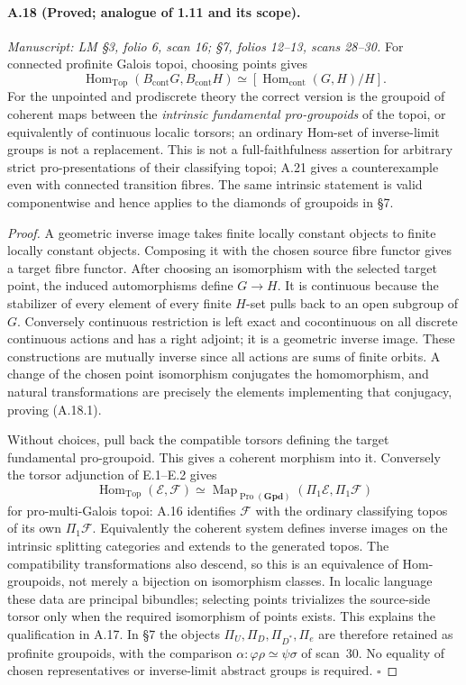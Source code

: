 \paragraph{A.18 (Proved; analogue of 1.11 and its scope).}
\textit{Manuscript: LM \S3, folio 6, scan 16; \S7, folios 12--13, scans 28--30.}
For connected profinite Galois topoi, choosing points gives
\[
 \operatorname{Hom}_{\mathrm{Top}}(B_{\mathrm{cont}}G,
                                  B_{\mathrm{cont}}H)
 \simeq[\operatorname{Hom}_{\mathrm{cont}}(G,H)/H].
                                                        \tag{A.18.1}
\]
For the unpointed and prodiscrete theory the correct version is the groupoid of coherent maps between the \emph{intrinsic fundamental pro-groupoids} of the topoi, or equivalently of continuous localic torsors; an ordinary Hom-set of inverse-limit groups is not a replacement. This is not a full-faithfulness assertion for arbitrary strict pro-presentations of their classifying topoi; A.21 gives a counterexample even with connected transition fibres. The same intrinsic statement is valid componentwise and hence applies to the diamonds of groupoids in \S7.
\begin{proof}
A geometric inverse image takes finite locally constant objects to finite locally constant objects. Composing it with the chosen source fibre functor gives a target fibre functor. After choosing an isomorphism with the selected target point, the induced automorphisms define $G\to H$. It is continuous because the stabilizer of every element of every finite $H$-set pulls back to an open subgroup of $G$. Conversely continuous restriction is left exact and cocontinuous on all discrete continuous actions and has a right adjoint; it is a geometric inverse image. These constructions are mutually inverse since all actions are sums of finite orbits. A change of the chosen point isomorphism conjugates the homomorphism, and natural transformations are precisely the elements implementing that conjugacy, proving (A.18.1).

Without choices, pull back the compatible torsors defining the target fundamental pro-groupoid. This gives a coherent morphism into it. Conversely the torsor adjunction of E.1--E.2 gives
\[
 \operatorname{Hom}_{\mathrm{Top}}(\mathcal E,\mathcal F)
 \simeq\operatorname{Map}_{\operatorname{Pro}(\mathbf{Gpd})}
             (\Pi_1\mathcal E,\Pi_1\mathcal F)
\]
for pro-multi-Galois topoi: A.16 identifies $\mathcal F$ with the ordinary classifying topos of its own $\Pi_1\mathcal F$. Equivalently the coherent system defines inverse images on the intrinsic splitting categories and extends to the generated topos. The compatibility transformations also descend, so this is an equivalence of Hom-groupoids, not merely a bijection on isomorphism classes. In localic language these data are principal bibundles; selecting points trivializes the source-side torsor only when the required isomorphism of points exists. This explains the qualification in A.17. In \S7 the objects $\Pi_U,\Pi_D,\Pi_{D^*},\Pi_e$ are therefore retained as profinite groupoids, with the comparison $\alpha:\varphi\rho\simeq\psi\sigma$ of scan~30. No equality of chosen representatives or inverse-limit abstract groups is required. \hfill$\square$
\end{proof}

